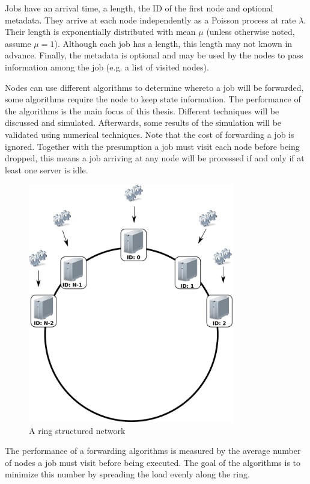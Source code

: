 \documentclass[10pt,a4paper]{article}
\begin{document}
Jobs have an arrival time, a length, the ID of the first node and optional metadata. They arrive at each node independently as a Poisson process at rate $\lambda$. Their length is exponentially distributed with mean $\mu$ (unless otherwise noted, assume $\mu=1$). Although each job has a length, this length may not known in advance. Finally, the metadata is optional and may be used by the nodes to pass information among the job (e.g. a list of visited nodes).

Nodes can use different algorithms to determine whereto a job will be forwarded, some algorithms require the node to keep state information. The performance of the algorithms is the main focus of this thesis. Different techniques will be discussed and simulated. Afterwards, some results of the simulation will be validated using numerical techniques.
Note that the cost of forwarding a job is ignored. Together with the presumption a job must visit each node before being dropped, this means a job arriving at any node will be processed if and only if at least one server is idle.

\begin{figure}[h!tb]
\centering
\includegraphics[width=0.8\textwidth,clip=true,trim=0px 225px 0px 0px]{resources/drawing.pdf}
\caption{A ring structured network}
\label{figring}
\end{figure}

The performance of a forwarding algorithms is measured by the average number of nodes a job must visit before being executed. The goal of the algorithms is to minimize this number by spreading the load evenly along the ring. 
\end{document}
